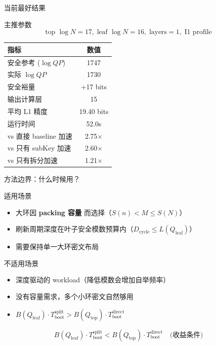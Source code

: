 \documentclass[aspectratio=169, 10pt, xcolor=svgnames, table, UTF8]{ctexbeamer}
\begin{document}
\begin{frame}{当前最好结果}
  \begin{block}{主推参数}
    \[
    \boxed{\text{top } \log N=17,\; \text{leaf } \log N=16,\; \text{layers}=1,\; \text{I1 profile}}
    \]
  \end{block}
  
  \begin{center}
    \small
    \begin{tabular}{@{}lc@{}}
      \toprule
      指标 & 数值 \\
      \midrule
      安全参考 (\(\log QP\)) & 1747 \\
      实际 \(\log QP\) & 1730 \\
      安全裕量 & \alert{+17 bits} \\
      输出计算层 & 15 \\
      平均 L1 精度 & \alert{19.40 bits} \\
      运行时间 & 52.0s \\
      vs 直接 baseline 加速 & \alert{2.75\(\times\)} \\
      vs 只有 subKey 加速 & \alert{2.60\(\times\)} \\
      vs 只有拆分加速 & \alert{1.21\(\times\)} \\
      \bottomrule
    \end{tabular}
  \end{center}
\end{frame}

\begin{frame}{方法边界：什么时候用？}
  \begin{block}{适用场景}
    \begin{itemize}
      \item 大环因 \textbf{packing 容量} 而选择（\(S(n) < M \le S(N)\)）
      \item 刷新周期深度在叶子安全模数预算内（\(D_{\mathrm{cycle}} \le L(Q_{\mathrm{leaf}})\)）
      \item 需要保持单一大环密文布局
    \end{itemize}
  \end{block}
  
  \pause
  
  \begin{alertblock}{不适用场景}
    \begin{itemize}
      \item 深度驱动的 workload（降低模数会增加自举频率）
      \item 没有容量需求，多个小环密文自然够用
      \item \(B(Q_{\mathrm{leaf}}) \cdot T_{\mathrm{boot}}^{\mathrm{split}} > B(Q_{\mathrm{top}}) \cdot T_{\mathrm{boot}}^{\mathrm{direct}}\)
    \end{itemize}
  \end{alertblock}
  
  \[
  \boxed{B(Q_{\mathrm{leaf}}) \cdot T_{\mathrm{boot}}^{\mathrm{split}} < B(Q_{\mathrm{top}}) \cdot T_{\mathrm{boot}}^{\mathrm{direct}}} \quad\text{(收益条件)}
  \]
\end{frame}
\end{document}
